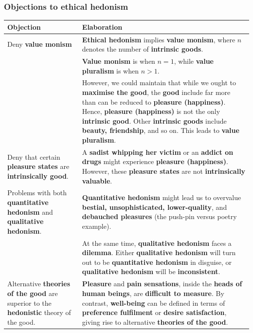 \documentclass[11pt]{article}
\begin{document}
 \newpage
\subsubsection{Objections to ethical hedonism}
\label{sec:org4bb6f67}
\begin{center}
\begin{tabular}{|m{10em}|m{25em}|}
\hline
Objection & Elaboration\\
\hline
Deny \textbf{value monism} & \textbf{Ethical hedonism} implies \textbf{value monism}, where \(n\) denotes the number of \textbf{intrinsic goods}.\\
 & \textbf{Value monism} is when \(n = 1\), while \textbf{value pluralism} is when \(n > 1\).\\
 & However, we could maintain that while we ought to \textbf{maximise the good}, the \textbf{good} include far more than can be reduced to \textbf{pleasure (happiness)}. Hence, \textbf{pleasure (happiness)} is not the only \textbf{intrinsic good}. Other \textbf{intrinsic goods} include \textbf{beauty, friendship}, and so on. This leads to \textbf{value pluralism}.\\
\hline
Deny that certain \textbf{pleasure states} are \textbf{intrinsically good}. & A \textbf{sadist whipping her victim} or an \textbf{addict on drugs} might experience \textbf{pleasure (happiness)}. However, these \textbf{pleasure states} are not \textbf{intrinsically valuable}.\\
Problems with both \textbf{quantitative hedonism} and \textbf{qualitative hedonism}. & \textbf{Quantitative hedonism} might lead us to overvalue \textbf{bestial, unsophisticated, lower-quality}, and \textbf{debauched pleasures} (the push-pin versus poetry example).\\
 & At the same time, \textbf{qualitative hedonism} faces a \textbf{dilemma}. Either \textbf{qualitative hedonism} will turn out to be \textbf{quantitative hedonism} in disguise, or \textbf{qualitative hedonism} will be \textbf{inconsistent}.\\
\hline
Alternative \textbf{theories of the good} are superior to the \textbf{hedonistic} theory of the good. & \textbf{Pleasure} and \textbf{pain sensations}, inside the \textbf{heads of human beings}, are \textbf{difficult to measure}. By contrast, \textbf{well-being} can be defined in terms of \textbf{preference fulfilment} or \textbf{desire satisfaction}, giving rise to alternative \textbf{theories of the good}.\\
\hline
\end{tabular}
\end{center}
\end{document}
